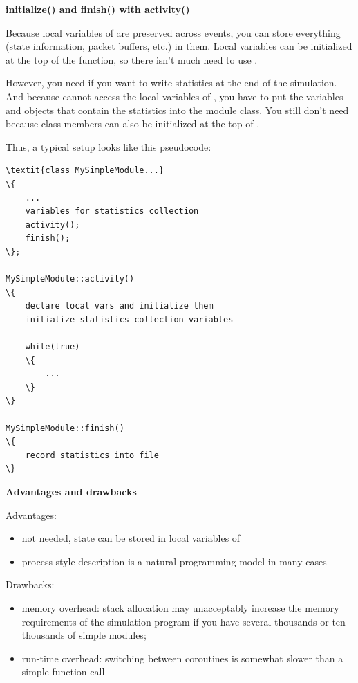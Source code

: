 \textbf{initialize() and finish() with activity()}


Because local variables of  are preserved across
events, you can store everything (state information, packet buffers,
etc.) in them. Local variables can be initialized at the top of the
 function, so there isn't much need to use
.


However, you need  if you want to write statistics at 
the end of the simulation. And because  cannot access 
the local variables of , you have to put the variables 
and objects that contain the statistics into the module class. 
You still don't need  because class members can also 
be initialized at the top of .


Thus, a typical setup looks like this pseudocode:


\begin{Verbatim}[commandchars=\\\{\}]
\textit{class MySimpleModule...}
\{
    ...
    variables for statistics collection
    activity();
    finish();
\};

MySimpleModule::activity()
\{
    declare local vars and initialize them
    initialize statistics collection variables
    
    while(true)
    \{
        ...
    \}
\}

MySimpleModule::finish()
\{
    record statistics into file
\}
\end{Verbatim}
  


\textbf{Advantages and drawbacks}

Advantages:
\begin{itemize}
\item{ not needed, state can be stored in local
    variables of }
\item{process-style description is a natural programming model in many
    cases}
\end{itemize}

Drawbacks:
\begin{itemize}
\item{memory overhead: stack allocation may unacceptably increase the 
    memory requirements of the simulation program if you have several 
    thousands or ten thousands of simple modules;}
\item{run-time overhead: switching between coroutines is somewhat slower 
    than a simple function call}
\end{itemize}


